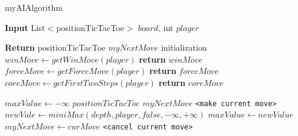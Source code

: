 \documentclass[a4paper]{article}
\begin{document}
\begin{algorithm}
\caption{myAIAlgorithm}
\begin{algorithmic}[]

\State \textbf{Input} List$<$positionTicTacToe$>$ $board$, int $player$

\State \textbf{Return} positionTicTacToe $myNextMove$
\State
{}     
\State
\State initialization
\State
\State $ winMove \gets getWinMove(player)$  
    \State  \textbf{return} $winMove$
\EndIf
\State
\State $ forceMove \gets getForceMove(player)$  
    \State  \textbf{return} $forceMove$
\EndIf
\State
\State $ coreMove \gets getFirstTwoSteps(player)$  
    \State  \textbf{return} $coreMove$
\EndIf
\State

\State $maxValue \gets -\infty$
\State $positionTicTacToe$ $myNextMove$
\State
\Do {}
        \State \texttt{<make current move>}
	  \State $newVale \gets miniMax(depth, player, false, -\infty, +\infty)$
    	           \State  $maxValue \gets newValue$
		     \State $myNextMove \gets curMove$
         \EndIf
	   \State \texttt{<cancel current move>}  
      \EndFor

\EndProcedure
\end{algorithmic}
\end{algorithm}
\end{document}

